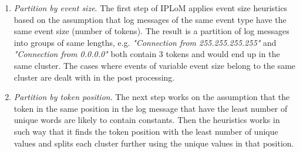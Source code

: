     \begin{enumerate}
        \item \textit{Partition by event size}. The first step of IPLoM applies event size heuristics based on the assumption that log messages of the same event type have the same event size (number of tokens). The result is a partition of log messages into groups of same lengths, e.g. \textit{"Connection from 255.255.255.255"} and \textit{"Connection from 0.0.0.0"} both contain $3$ tokens and would end up in the same cluster. The cases where events of variable event size belong to the same cluster are dealt with in the post processing.
        
        \item \textit{Partition by token position}. The next step works on the assumption that the token in the same position in the log message that have the least number of unique words are likely to contain constants. Then the heuristics works in such way that it finds the token position with the least number of unique values and splits each cluster further using the unique values in that position. 
        

\end{enumerate}
